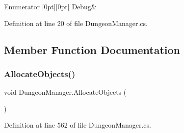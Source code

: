\begin{DoxyEnumFields}{Enumerator}
[0pt][0pt]{}\mbox{\label{class_dungeon_manager_a6558d4a01889674bf25c798f1b90a431aa603905470e2a5b8c13e96b579ef0dba}} 
Debug&\\
\hline

\end{DoxyEnumFields}


Definition at line 20 of file Dungeon\+Manager.\+cs.



\subsection{Member Function Documentation}
\mbox{\label{class_dungeon_manager_a196f2f6754dae0d38307197bbbf033c4}} 
\subsubsection{\texorpdfstring{AllocateObjects()}{AllocateObjects()}}
{\footnotesize\ttfamily void Dungeon\+Manager.\+Allocate\+Objects (\begin{DoxyParamCaption}{ }\end{DoxyParamCaption})}



Definition at line 562 of file Dungeon\+Manager.\+cs.

